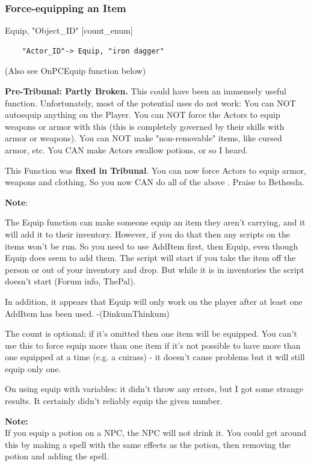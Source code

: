 \hypertarget{force-equipping-an-item}{%
\subsubsection{\texorpdfstring{\hfill\break
Force-equipping an Item
}{ Force-equipping an Item }}\label{force-equipping-an-item}}

Equip, "Object\_ID" {[}count\_enum{]}

\begin{lstlisting}
	"Actor_ID"-> Equip, "iron dagger"
\end{lstlisting}

(Also see OnPCEquip function below)

\textbf{Pre-Tribunal: Partly Broken.} This could have been an immensely
useful function. Unfortunately, most of the potential uses do not work:
You can NOT autoequip anything on the Player. You can NOT force the
Actors to equip weapons or armor with this (this is completely governed
by their skills with armor or weapons). You can NOT make "non-removable"
items, like cursed armor, etc. You CAN make Actors swallow potions, or
so I heard.

This Function was \textbf{fixed in Tribunal}. You can now force Actors
to equip armor, weapons and clothing. So you now CAN do all of the above
. Praise to Bethesda.

\textbf{Note}:

The Equip function can make someone equip an item they aren't carrying,
and it will add it to their inventory. However, if you do that then any
scripts on the items won't be run. So you need to use AddItem first,
then Equip, even though Equip does seem to add them. The script will
start if you take the item off the person or out of your inventory and
drop. But while it is in inventories the script doesn't start (Forum
info, ThePal).

In addition, it appears that Equip will only work on the player after at
least one AddItem has been used. -(DinkumThinkum)

The count is optional; if it's omitted then one item will be equipped.
You can't use this to force equip more than one item if it's not
possible to have more than one equipped at a time (e.g. a cuirass) - it
doesn't cause problems but it will still equip only one.

On using equip with variables: it didn't throw any errors, but I got
some strange results. It certainly didn't reliably equip the given
number.

\textbf{Note:\\
}If you equip a potion on a NPC, the NPC will not drink it. You could
get around this by making a spell with the same effects as the potion,
then removing the potion and adding the spell.\textbf{\hfill\break
}

